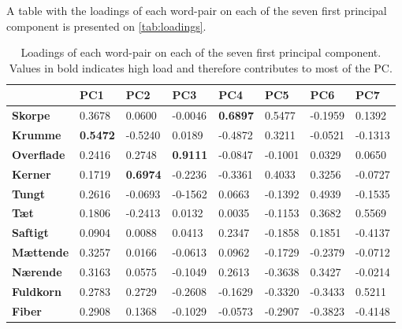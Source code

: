 A table with the loadings of each word-pair on each of the seven first principal component is presented on \autoref{tab:loadings}.
%
\begin{table}[H]
\centering
\begin{tabular}{llllllll}
\hline
\textbf{}                               & \textbf{PC1}    & \textbf{PC2}    & \textbf{PC3}    & \textbf{PC4}    & \textbf{PC5} & \textbf{PC6} & \textbf{PC7} \\ \hline
\multicolumn{1}{l|}{\textbf{Skorpe}}    & 0.3678          & 0.0600          & -0.0046         & \textbf{0.6897} & 0.5477       & -0.1959      & 0.1392       \\
\multicolumn{1}{l|}{\textbf{Krumme}}    & \textbf{0.5472} & -0.5240         & 0.0189          & -0.4872         & 0.3211       & -0.0521      & -0.1313      \\
\multicolumn{1}{l|}{\textbf{Overflade}} & 0.2416          & 0.2748          & \textbf{0.9111} & -0.0847         & -0.1001      & 0.0329       & 0.0650       \\
\multicolumn{1}{l|}{\textbf{Kerner}}    & 0.1719          & \textbf{0.6974} & -0.2236         & -0.3361         & 0.4033       & 0.3256       & -0.0727      \\
\multicolumn{1}{l|}{\textbf{Tungt}}     & 0.2616          & -0.0693         & -0-1562         & 0.0663          & -0.1392      & 0.4939       & -0.1535      \\
\multicolumn{1}{l|}{\textbf{Tæt}}       & 0.1806          & -0.2413         & 0.0132          & 0.0035          & -0.1153      & 0.3682       & 0.5569       \\
\multicolumn{1}{l|}{\textbf{Saftigt}}   & 0.0904          & 0.0088          & 0.0413          & 0.2347          & -0.1858      & 0.1851       & -0.4137      \\
\multicolumn{1}{l|}{\textbf{Mættende}}  & 0.3257          & 0.0166          & -0.0613         & 0.0962          & -0.1729      & -0.2379      & -0.0712      \\
\multicolumn{1}{l|}{\textbf{Nærende}}   & 0.3163          & 0.0575          & -0.1049         & 0.2613          & -0.3638      & 0.3427       & -0.0214      \\
\multicolumn{1}{l|}{\textbf{Fuldkorn}}  & 0.2783          & 0.2729          & -0.2608         & -0.1629         & -0.3320      & -0.3433      & 0.5211       \\
\multicolumn{1}{l|}{\textbf{Fiber}}     & 0.2908          & 0.1368          & -0.1029         & -0.0573         & -0.2907      & -0.3823      & -0.4148     
\end{tabular}
\caption{Loadings of each word-pair on each of the seven first principal component. Values in bold indicates high load and therefore contributes to most of the PC.}
\label{tab:loadings}
\end{table}
